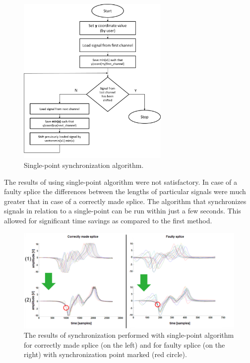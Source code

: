 \documentclass[applsci,article,preprint,moreauthors,pdftex]{Definitions/mdpi}
\begin{document}
\begin{figure}[ht!]
\centering
\includegraphics[width=0.65\textwidth]{figs/block2.png}
\caption{Single-point synchronization algorithm.}
\label{fig:block2}
\end{figure}

The results of using single-point algorithm were not satisfactory. In case of a faulty splice the differences between the lengths of particular signals were much greater that in case of a correctly made splice. The algorithm that synchronizes signals in relation to a single-point can be run within just a few seconds. This allowed for significant time savings as compared to the first method.

\begin{figure}[ht!]
\centering
\includegraphics[width=\textwidth]{figs/fp1.png}
\caption{The results of synchronization performed with single-point algorithm for correctly made splice (on the left) and for faulty splice (on the right) with synchronization point marked (red circle).}
\label{fig:fp1}
\end{figure}
\end{document}
